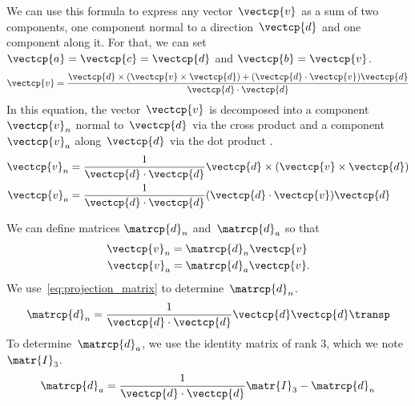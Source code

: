 We can use this formula to express any vector~$\vectcp{v}$ as a sum of two components,
one component normal to a direction~$\vectcp{d}$
and
one component along it.
For that, we can set $\vectcp{a} = \vectcp{c} = \vectcp{d}$ and $\vectcp{b}=\vectcp{v}$.
\begin{equation}
    \vectcp{v} =
    \frac{
        \vectcp{d} \times (\vectcp{v} \times \vectcp{d}) +
        (\vectcp{d} \cdot \vectcp{v}) \vectcp{d}
    }{
        \vectcp{d} \cdot \vectcp{d}
    }
    \label{eq:vector_triple_product_decomposition}
\end{equation}
In this equation, the vector~$\vectcp{v}$ is decomposed into a component
$\vectcp{v}_n$ normal to~$\vectcp{d}$ via the cross product
and a component
$\vectcp{v}_a$ along~$\vectcp{d}$ via the dot product%
.
\begin{subequations}
    \begin{align}
        \vectcp{v}_n
        &=
        \frac{1}{\vectcp{d} \cdot \vectcp{d}}
        \vectcp{d} \times (\vectcp{v} \times \vectcp{d})
        \\
        \vectcp{v}_a
        &=
        \frac{1}{\vectcp{d} \cdot \vectcp{d}}
        (\vectcp{d} \cdot \vectcp{v}) \vectcp{d}
    \end{align}
\end{subequations}

We can define matrices $\matrcp{d}_n$ and~$\matrcp{d}_a$ so that
\begin{subequations}
    \begin{align}
        \vectcp{v}_n &= \matrcp{d}_n \vectcp{v} \\
        \vectcp{v}_a &= \matrcp{d}_a \vectcp{v}
        \text{.}
    \end{align}
\end{subequations}
We use~\cref{eq:projection_matrix} to determine~$\matrcp{d}_n$.
\begin{equation}
    \matrcp{d}_n = \frac{1}{\vectcp{d} \cdot \vectcp{d}} \vectcp{d} \vectcp{d}\transp
    \label{eq:matrix_decomposition_normal}
\end{equation}
To determine~$\matrcp{d}_a$, we use the identity matrix of rank 3, which we note~$\matr{I}_3$.
\begin{equation}
    \matrcp{d}_a = \frac{1}{\vectcp{d} \cdot \vectcp{d}} \matr{I}_3 - \matrcp{d}_n
    \label{eq:matrix_decomposition_along}
\end{equation}


